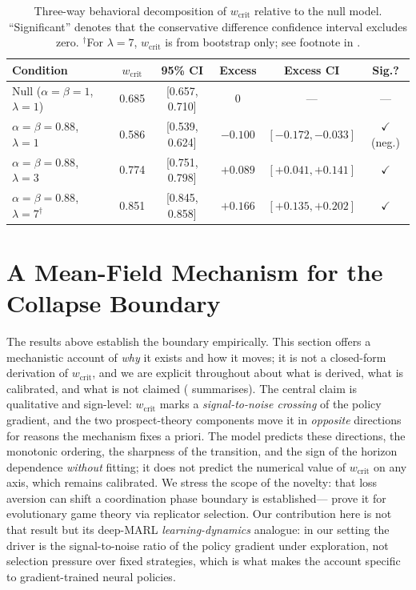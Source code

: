 \documentclass[11pt]{article}
\newcommand{\wcrit}{w_{\mathrm{crit}}}
\begin{document}
\begin{table}[t]
\centering
\caption{Three-way behavioral decomposition of $\wcrit$ relative to the
null model. ``Significant'' denotes that the conservative difference
confidence interval excludes zero. $^{\dagger}$For $\lambda{=}7$,
$\wcrit$ is from bootstrap only; see footnote in
.}
\label{tab:decomposition}
\small
\begin{tabular}{lccccc}
\toprule
Condition & $\wcrit$ & 95\% CI & Excess & Excess CI & Sig.? \\
\midrule
Null ($\alpha{=}\beta{=}1$, $\lambda{=}1$) & 0.685 & [0.657, 0.710] & 0 & --- & --- \\
$\alpha{=}\beta{=}0.88$, $\lambda{=}1$ & 0.586 & [0.539, 0.624] & $-0.100$ & $[-0.172, -0.033]$ & $\checkmark$ (neg.) \\
$\alpha{=}\beta{=}0.88$, $\lambda{=}3$ & 0.774 & [0.751, 0.798] & $+0.089$ & $[+0.041, +0.141]$ & $\checkmark$ \\
$\alpha{=}\beta{=}0.88$, $\lambda{=}7$$^{\dagger}$ & 0.851 & [0.845, 0.858] & $+0.166$ & $[+0.135, +0.202]$ & $\checkmark$ \\
\bottomrule
\end{tabular}
\end{table}

\section{A Mean-Field Mechanism for the Collapse Boundary}
\label{sec:meanfield}

The results above establish the boundary empirically. This section offers a
mechanistic account of \emph{why} it exists and how it moves; it is not a
closed-form derivation of $\wcrit$, and we are explicit throughout about
what is derived, what is calibrated, and what is not claimed
( summarises). The central claim is qualitative and
sign-level: $\wcrit$ marks a \emph{signal-to-noise crossing} of the policy
gradient, and the two prospect-theory components move it in \emph{opposite}
directions for reasons the mechanism fixes a priori. The model predicts
these directions, the monotonic ordering, the sharpness of the transition,
and the sign of the horizon dependence \emph{without} fitting; it does not
predict the numerical value of $\wcrit$ on any axis, which remains
calibrated. We stress the scope of the novelty: that loss aversion can
shift a coordination phase boundary is established---\citet{mengesha2025}
prove it for evolutionary game theory via replicator selection. Our
contribution here is not that result but its deep-MARL \emph{learning-dynamics}
analogue: in our setting the driver is the signal-to-noise ratio of the
policy gradient under exploration, not selection pressure over fixed
strategies, which is what makes the account specific to gradient-trained
neural policies.
\end{document}
